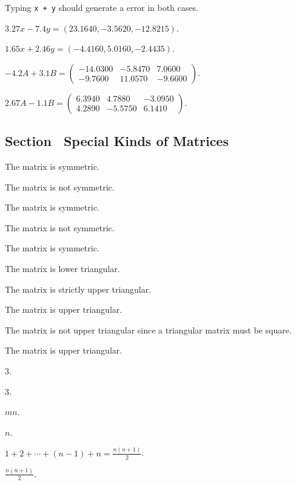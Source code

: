 Typing {\tt x + y} should generate a \Matlab error in both cases.

  $3.27x - 7.4y = (23.1640, -3.5620, -12.8215)$.

  $1.65x + 2.46y = (-4.4160, 5.0160, -2.4435)$.

  $-4.2A + 3.1B = \left(\begin{array}{rrr} 
-14.0300 & -5.8470 &    7.0600 \\
 -9.7600 & 11.0570 &   -9.6600\end{array}\right)$.

  $2.67A - 1.1B = \left(\begin{array}{rrr} 
    6.3940  &  4.7880 &  -3.0950\\
    4.2890  & -5.5750 &   6.1410 \end{array}\right)$.



\subsection*{Section~\protect{\ref{S:1.3}} Special Kinds of Matrices}

 The matrix is symmetric.

 The matrix is not symmetric.

 The matrix is symmetric.

 The matrix is not symmetric.

 The matrix is symmetric.

 The matrix is lower triangular.

 The matrix is strictly upper triangular.

 The matrix is upper triangular.

 The matrix is not upper triangular since a triangular
matrix must be square.

\newpage
{} The matrix is upper triangular.

 $3$.

 $3$.

 $mn$.

 $n$.

 $1 + 2 + \cdots + (n-1) + n = \frac{n(n + 1)}{2}$.

 $\frac{n(n + 1)}{2}$.

